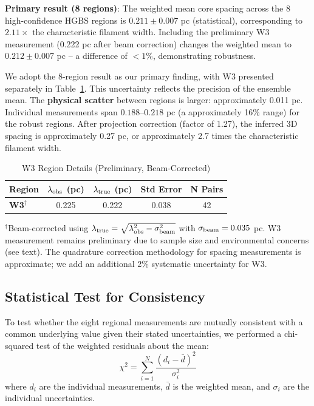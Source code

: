 \documentclass[11pt,a4paper]{article}
\begin{document}
\noindent\textbf{Primary result (8 regions)}: The weighted mean core spacing across the 8 high-confidence HGBS regions is $0.211 \pm 0.007$ pc (statistical), corresponding to $2.11\times$ the characteristic filament width. Including the preliminary W3 measurement (0.222 pc after beam correction) changes the weighted mean to $0.212 \pm 0.007$ pc -- a difference of $<1$\%, demonstrating robustness.

We adopt the 8-region result as our primary finding, with W3 presented separately in Table~\ref{tab:w3_detail}. This uncertainty reflects the precision of the ensemble mean. The \textbf{physical scatter} between regions is larger: approximately 0.011 pc. Individual measurements span $0.188$--$0.218$ pc (a approximately 16\% range) for the robust regions. After projection correction (factor of 1.27), the inferred 3D spacing is approximately 0.27 pc, or approximately 2.7 times the characteristic filament width.

\begin{table}[H]
\centering
\caption{W3 Region Details (Preliminary, Beam-Corrected)}
\label{tab:w3_detail}
\begin{tabular}{lcccc}
\toprule
Region & $\lambda_{\rm obs}$ (pc) & $\lambda_{\rm true}$ (pc) & Std Error & N Pairs \\
\midrule
\textbf{W3}$^{\dagger}$ & 0.225 & 0.222 & 0.038 & 42 \\
\bottomrule
\end{tabular}
\vspace{-0.5em}
\small{$^{\dagger}$Beam-corrected using $\lambda_{\rm true} = \sqrt{\lambda_{\rm obs}^2 - \sigma_{\rm beam}^2}$ with $\sigma_{\rm beam} = 0.035$ pc. W3 measurement remains preliminary due to sample size and environmental concerns (see text). The quadrature correction methodology for spacing measurements is approximate; we add an additional 2\% systematic uncertainty for W3.}
\end{table}

\subsection{Statistical Test for Consistency}

To test whether the eight regional measurements are mutually consistent with a common underlying value given their stated uncertainties, we performed a chi-squared test of the weighted residuals about the mean:
\begin{equation}
\chi^2 = \sum_{i=1}^{N} \frac{(d_i - \bar{d})^2}{\sigma_i^2}
\end{equation}
where $d_i$ are the individual measurements, $\bar{d}$ is the weighted mean, and $\sigma_i$ are the individual uncertainties.
\end{document}
